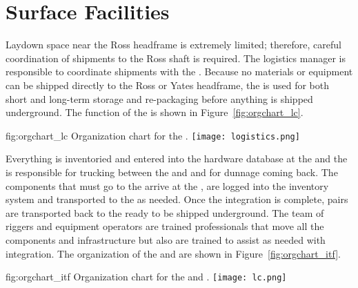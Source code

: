 \section{Surface Facilities}

Laydown space near the Ross headframe is extremely limited; therefore,
careful coordination of shipments to the Ross shaft is required. The
 logistics manager is responsible to coordinate shipments
with the .  Because no materials or equipment can be
shipped directly to the Ross or Yates headframe, the  is
used for both short and long-term storage and re-packaging before
anything is shipped underground.  The function of the  is
shown in Figure~\ref{fig:orgchart_lc}.
\begin{dunefigure}{fig:orgchart_lc}
  {Organization chart for the .}
  \texttt{[image: logistics.png]}
\end{dunefigure}
Everything is inventoried and entered into the hardware database at
the  and the  is responsible for trucking between
the  and \surf and for dunnage coming back. The 
components that must go to
the  arrive at the , are logged into the
inventory system and transported to the  as
needed. Once the integration is complete,  pairs are
transported back to the  ready to be shipped underground.
The team of riggers and equipment operators are trained professionals
that move all the  components and infrastructure but also
are trained to assist as needed with integration. The organization of
the  and  are shown in
Figure~\ref{fig:orgchart_itf}.
\begin{dunefigure}{fig:orgchart_itf}
  {Organization chart for the  and .}
  \texttt{[image: lc.png]}
\end{dunefigure}

\subsection{}

